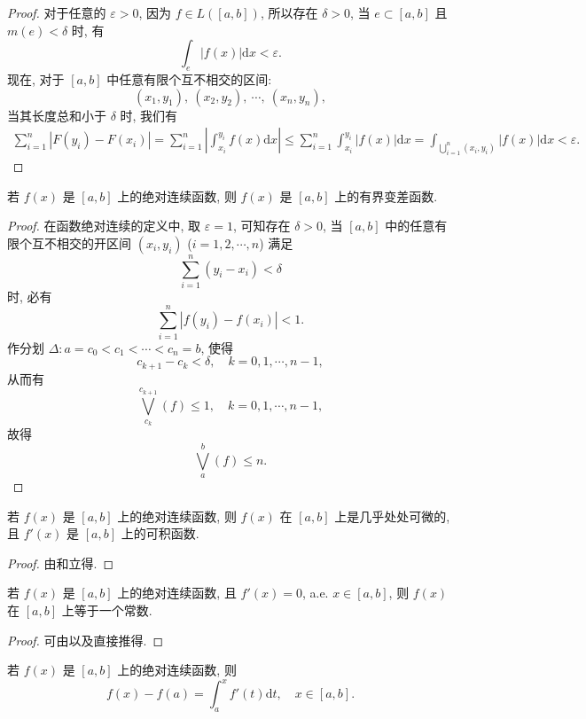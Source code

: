 \documentclass[../../main.tex]{subfiles}%
\begin{document}
\begin{proof}
对于任意的 $\varepsilon>0$, 因为 $f\in L([a,b])$, 所以存在 $\delta>0$, 当 $e\subset[a,b]$ 且 $m(e)<\delta$ 时, 有
\[
\int_e |f(x)|\mathrm{d}x < \varepsilon.
\]
现在, 对于 $[a,b]$ 中任意有限个互不相交的区间:
\[
(x_1,y_1),\ (x_2,y_2),\ \cdots,\ (x_n,y_n),
\]
当其长度总和小于 $\delta$ 时, 我们有
\begin{align*}
\sum_{i=1}^n |F(y_i)-F(x_i)| = \sum_{i=1}^n \left|\int_{x_i}^{y_i} f(x)\mathrm{d}x\right| \leqslant \sum_{i=1}^n \int_{x_i}^{y_i} |f(x)|\mathrm{d}x 
= \int_{\bigcup_{i=1}^n (x_i,y_i)} |f(x)|\mathrm{d}x < \varepsilon.
\end{align*}
\end{proof}

\begin{theorem}\label{theorem:AC一定BV}
若 $f(x)$ 是 $[a,b]$ 上的绝对连续函数, 则 $f(x)$ 是 $[a,b]$ 上的有界变差函数.
\end{theorem}
\begin{proof}
在函数绝对连续的定义中, 取 $\varepsilon=1$, 可知存在 $\delta>0$, 当 $[a,b]$ 中的任意有限个互不相交的开区间 $(x_i,y_i)$ ($i=1,2,\cdots,n$) 满足
\[
\sum_{i=1}^n (y_i-x_i) < \delta
\]
时, 必有
\[
\sum_{i=1}^n |f(y_i)-f(x_i)| < 1.
\]
作分划 $\Delta: a=c_0 < c_1 < \cdots < c_n = b$, 使得
\[
c_{k+1}-c_k < \delta,\quad k=0,1,\cdots,n-1,
\]
从而有
\[
\bigvee_{c_k}^{c_{k+1}}(f) \leqslant 1,\quad k=0,1,\cdots,n-1,
\]
故得
\[
\bigvee_a^b(f) \leqslant n.
\]
\end{proof}

\begin{corollary}\label{corollary:绝对连续函数几乎处处可微且导数可积}
若 $f(x)$ 是 $[a,b]$ 上的绝对连续函数, 则 $f(x)$ 在 $[a,b]$ 上是几乎处处可微的, 且 $f'(x)$ 是 $[a,b]$ 上的可积函数.
\end{corollary}
\begin{proof}
由和立得.
\end{proof}

\begin{theorem}
若 $f(x)$ 是 $[a,b]$ 上的绝对连续函数, 且 $f'(x)=0$, a.e. $x\in[a,b]$, 则 $f(x)$ 在 $[a,b]$ 上等于一个常数.
\end{theorem}
\begin{proof}
可由以及直接推得.
\end{proof}


\begin{theorem}[微积分基本定理]\label{theorem:实变函数--微积分基本定理}
若 $f(x)$ 是 $[a,b]$ 上的绝对连续函数, 则
\[
f(x)-f(a) = \int_a^x f'(t)\mathrm{d}t,\quad x\in[a,b]. \tag{5.11}
\]
\end{theorem}
\end{document}
